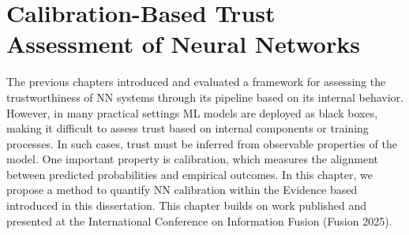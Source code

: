 \chapter{Calibration-Based Trust Assessment of Neural Networks}
\noindent
The previous chapters introduced and evaluated a framework for assessing the trustworthiness of \ac{NN} systems through its pipeline based on its internal behavior. However, in many practical settings \ac{ML} models are deployed as black boxes, making it difficult to assess trust based on internal components or training processes. In such cases, trust must be inferred from observable properties of the model. One important property is calibration, which measures the alignment between predicted probabilities and empirical outcomes. In this chapter, we propose a method to quantify \ac{NN} calibration within the Evidence based  introduced in this dissertation. This chapter builds on work published and presented at the International Conference on Information Fusion (Fusion 2025)\cite{11124121}.

